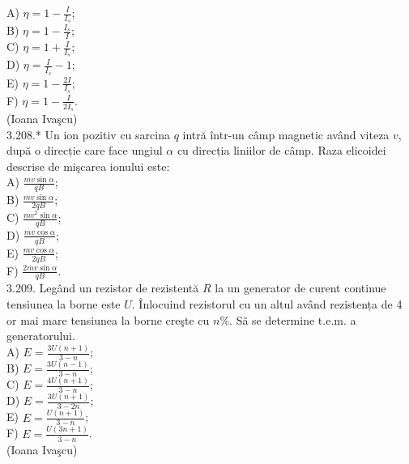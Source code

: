 \documentclass[10pt]{article}
\begin{document}
A) $\eta=1-\frac{I}{I_{s}}$;\\
B) $\eta=1-\frac{I_{s}}{I}$;\\
C) $\eta=1+\frac{I}{I_{s}}$;\\
D) $\eta=\frac{I}{I_{s}}-1$;\\
E) $\eta=1-\frac{2 I}{I_{s}}$;\\
F) $\eta=1-\frac{I}{2 I_{s}}$.\\
(Ioana Ivaşcu)\\
3.208.* Un ion pozitiv cu sarcina $q$ intră într-un câmp magnetic având viteza $v$, după o direcție care face ungiul $\alpha$ cu direcția liniilor de câmp. Raza elicoidei descrise de mişcarea ionului este:\\
A) $\frac{m v \sin \alpha}{q B}$;\\
B) $\frac{m v \sin \alpha}{2 q B}$;\\
C) $\frac{m v^{2} \sin \alpha}{q B}$;\\
D) $\frac{m v \cos \alpha}{q B}$;\\
E) $\frac{m v \cos \alpha}{2 q B}$;\\
F) $\frac{2 m v \sin \alpha}{q B}$.\\
3.209. Legând un rezistor de rezistentă $R$ la un generator de curent continue tensiunea la borne este $U$. Înlocuind rezistorul cu un altul având rezistența de 4 or mai mare tensiunea la borne creşte cu $n \%$. Să se determine t.e.m. a generatorului.\\
A) $E=\frac{3 U(n+1)}{3-n}$;\\
B) $E=\frac{3 U(n-1)}{3-n}$;\\
C) $E=\frac{4 U(n+1)}{3-n}$;\\
D) $E=\frac{3 U(n+1)}{3-2 n}$;\\
E) $E=\frac{U(n+1)}{3-n}$;\\
F) $E=\frac{U(3 n+1)}{3-n}$.\\
(Ioana Ivaşcu)
\end{document}
